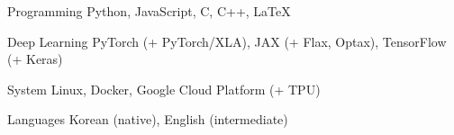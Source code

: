 \documentclass[11pt, a4paper]{cv}
\begin{document}
\begin{cvskills}

  \cvskill
    {Programming} %
    {Python, JavaScript, C, C++, LaTeX} %

  \cvskill
    {Deep Learning} %
    {PyTorch (+ PyTorch/XLA), JAX (+ Flax, Optax), TensorFlow (+ Keras)} %

  \cvskill
    {System} %
    {Linux, Docker, Google Cloud Platform (+ TPU)} %

  \cvskill
    {Languages} %
    {Korean (native), English (intermediate)} %

\end{cvskills}

\end{document}
